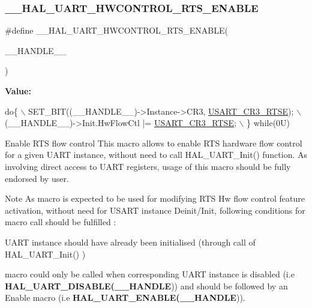 \subsubsection{\texorpdfstring{\+\_\+\+\_\+\+H\+A\+L\+\_\+\+U\+A\+R\+T\+\_\+\+H\+W\+C\+O\+N\+T\+R\+O\+L\+\_\+\+R\+T\+S\+\_\+\+E\+N\+A\+B\+LE}{\_\_HAL\_UART\_HWCONTROL\_RTS\_ENABLE}}
{\footnotesize\ttfamily \#define \+\_\+\+\_\+\+H\+A\+L\+\_\+\+U\+A\+R\+T\+\_\+\+H\+W\+C\+O\+N\+T\+R\+O\+L\+\_\+\+R\+T\+S\+\_\+\+E\+N\+A\+B\+LE(\begin{DoxyParamCaption}\item[{}]{\+\_\+\+\_\+\+H\+A\+N\+D\+L\+E\+\_\+\+\_\+ }\end{DoxyParamCaption})}

{\bfseries Value\+:}
\begin{DoxyCode}
\textcolor{keywordflow}{do}\{                                                     \(\backslash\)
    SET\_BIT((\_\_HANDLE\_\_)->Instance->CR3, \mbox{\hyperlink{group___peripheral___registers___bits___definition_ga7c5d6fcd84a4728cda578a0339b4cac2}{USART\_CR3\_RTSE}}); \(\backslash\)
    (\_\_HANDLE\_\_)->Init.HwFlowCtl |= \mbox{\hyperlink{group___peripheral___registers___bits___definition_ga7c5d6fcd84a4728cda578a0339b4cac2}{USART\_CR3\_RTSE}};       \(\backslash\)
  \} \textcolor{keywordflow}{while}(0U)
\end{DoxyCode}


Enable R\+TS flow control This macro allows to enable R\+TS hardware flow control for a given U\+A\+RT instance, without need to call H\+A\+L\+\_\+\+U\+A\+R\+T\+\_\+\+Init() function. As involving direct access to U\+A\+RT registers, usage of this macro should be fully endorsed by user. 

\begin{DoxyNote}{Note}
As macro is expected to be used for modifying R\+TS Hw flow control feature activation, without need for U\+S\+A\+RT instance Deinit/\+Init, following conditions for macro call should be fulfilled \+:
\begin{DoxyItemize}
\item U\+A\+RT instance should have already been initialised (through call of H\+A\+L\+\_\+\+U\+A\+R\+T\+\_\+\+Init() )
\item macro could only be called when corresponding U\+A\+RT instance is disabled (i.\+e {\bfseries H\+A\+L\+\_\+\+U\+A\+R\+T\+\_\+\+D\+I\+S\+A\+B\+LE(\+\_\+\+\_\+\+H\+A\+N\+D\+LE})) and should be followed by an Enable macro (i.\+e {\bfseries H\+A\+L\+\_\+\+U\+A\+R\+T\+\_\+\+E\+N\+A\+B\+LE(\+\_\+\+\_\+\+H\+A\+N\+D\+LE})). 
\end{DoxyItemize}
\end{DoxyNote}

